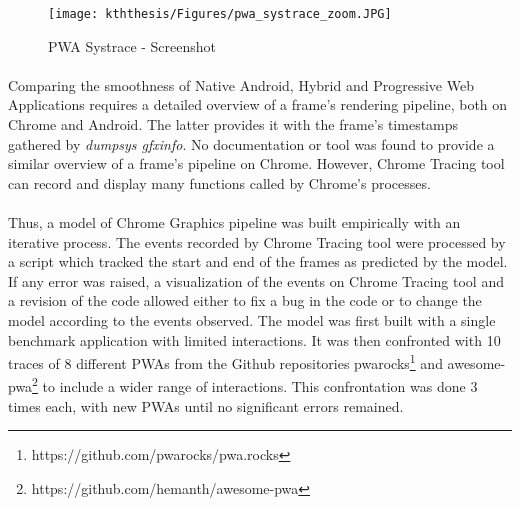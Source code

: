 \documentclass{kththesis}
\begin{document}
    \begin{figure}
        \centering
        \texttt{[image: kththesis/Figures/pwa\_systrace\_zoom.JPG]}
        \caption{PWA Systrace - Screenshot}
        \label{fig:pwa_systrace_zoom}
    \end{figure}
    
    \paragraph{}
    Comparing the smoothness of Native Android, Hybrid and Progressive Web Applications requires a detailed overview of a frame's rendering pipeline, both on Chrome and Android. The latter provides it with the frame's timestamps gathered by \textit{dumpsys gfxinfo}. No documentation or tool was found to provide a similar overview of a frame's pipeline on Chrome. However, Chrome Tracing tool can record and display many functions called by Chrome's processes.
    
    \paragraph{}
    Thus, a model of Chrome Graphics pipeline was built empirically with an iterative process. The events recorded by Chrome Tracing tool were processed by a script which tracked the start and end of the frames as predicted by the model. If any error was raised, a visualization of the events on Chrome Tracing tool and a revision of the code allowed either to fix a bug in the code or to change the model according to the events observed. \newline
    The model was first built with a single benchmark application with limited interactions. It was then confronted with 10 traces of 8 different PWAs from the Github repositories pwarocks\footnote{https://github.com/pwarocks/pwa.rocks} and awesome-pwa\footnote{https://github.com/hemanth/awesome-pwa} to include a wider range of interactions. This confrontation was done 3 times each, with new PWAs until no significant errors remained.
    
\end{document}
